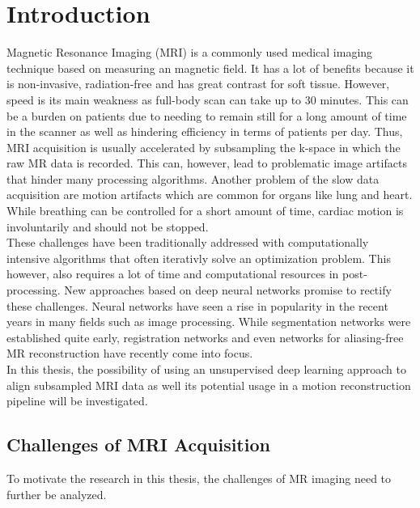 \documentclass[english,version-2022-01]{uzl-thesis} %
\begin{document}

\chapter{Introduction} \label{Ch:Introduction}
Magnetic Resonance Imaging (MRI) is a commonly used medical imaging technique based on measuring an magnetic field. It has a lot of benefits because it is non-invasive, radiation-free and has great contrast for soft tissue. However, speed is its main weakness as full-body scan can take up to 30 minutes. This can be a burden on patients due to needing to remain still for a long amount of time in the scanner as well as hindering efficiency in terms of patients per day. Thus, MRI acquisition is usually accelerated by subsampling the k-space in which the raw MR data is recorded. This can, however, lead to problematic image artifacts that hinder many processing algorithms. Another problem of the slow data acquisition are motion artifacts which are common for organs like lung and heart. While breathing can be controlled for a short amount of time, cardiac motion is involuntarily and should not be stopped. \\
These challenges have been traditionally addressed with computationally intensive algorithms that often iterativly solve an optimization problem. This however, also requires a lot of time and computational resources in post-processing. New approaches based on deep neural networks promise to rectify these challenges. Neural networks have seen a rise in popularity in the recent years in many fields such as image processing. While segmentation networks were established quite early, registration networks and even networks for aliasing-free MR reconstruction have recently come into focus.\\
In this thesis, the possibility of using an unsupervised deep learning approach to align subsampled MRI data as well its potential usage in a motion reconstruction pipeline will be investigated.

\section{Challenges of MRI Acquisition}
To motivate the research in this thesis, the challenges of MR imaging need to further be analyzed.
\end{document}
